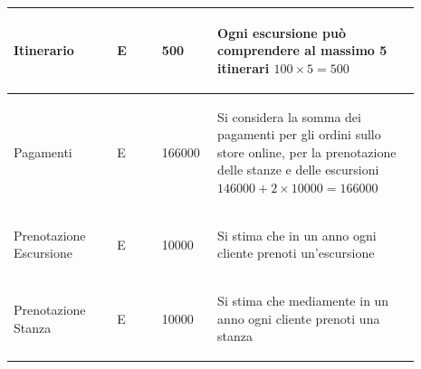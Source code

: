 \documentclass[12pt,a4paper]{article}
\begin{document}
\begin{center}
\begin{longtable}{|p{0.23\linewidth}|p{0.1\linewidth}|p{0.11\linewidth}|p{0.45\linewidth}|}
\hline
Itinerario
 & 
\begin{center}\vspace{-25pt}E\end{center}
 & 
\begin{center}\vspace{-25pt}500\end{center}
 & 
\begin{flushleft}\vspace{-25pt}Ogni escursione può comprendere al massimo 5 itinerari $100\times 5= 500$\end{flushleft}
\\

\hline
Pagamenti
 & 
\begin{center}\vspace{-25pt}E\end{center}
 & 
\begin{center}\vspace{-25pt}166000\end{center}
 & 
\begin{flushleft}\vspace{-25pt}Si considera la somma dei pagamenti per gli ordini sullo store online, per la prenotazione delle stanze e delle escursioni $146000+2\times 10000= 166000$\end{flushleft}
\\

\hline
Prenotazione Escursione
 & 
\begin{center}\vspace{-25pt}E\end{center}
 & 
\begin{center}\vspace{-25pt}10000\end{center}
 & 
\begin{flushleft}\vspace{-25pt}Si stima che in un anno ogni cliente prenoti un'escursione \end{flushleft}
\\

\hline
Prenotazione Stanza
 & 
\begin{center}\vspace{-25pt}E\end{center}
 & 
\begin{center}\vspace{-25pt}10000\end{center}
 & 
\begin{flushleft}\vspace{-25pt}Si stima che mediamente in un anno ogni cliente prenoti una stanza\end{flushleft}
\\


\end{longtable}
\end{center}
\end{document}
